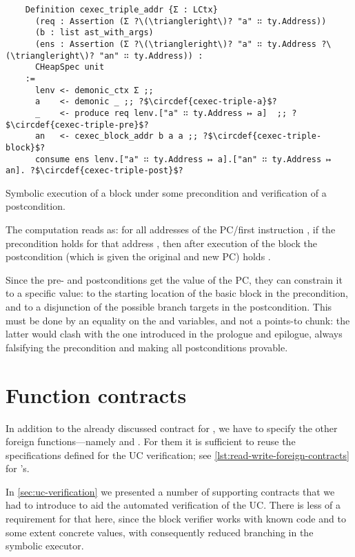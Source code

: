 \begin{listing}[htb]
  \startcstep
  \begin{verbatim}
    Definition cexec_triple_addr {Σ : LCtx}
      (req : Assertion (Σ ?\(\triangleright\)? "a" ∷ ty.Address))
      (b : list ast_with_args)
      (ens : Assertion (Σ ?\(\triangleright\)? "a" ∷ ty.Address ?\(\triangleright\)? "an" ∷ ty.Address)) :
      CHeapSpec unit
    :=
      lenv <- demonic_ctx Σ ;;
      a    <- demonic _ ;; ?$\circdef{cexec-triple-a}$?
      _    <- produce req lenv.["a" ∷ ty.Address ↦ a]  ;; ?$\circdef{cexec-triple-pre}$?
      an   <- cexec_block_addr b a a ;; ?$\circdef{cexec-triple-block}$?
      consume ens lenv.["a" ∷ ty.Address ↦ a].["an" ∷ ty.Address ↦ an]. ?$\circdef{cexec-triple-post}$?
  \end{verbatim}
  \caption{Symbolic execution of a block under some precondition and verification of a postcondition.}
  \label{lst:cexec-triple}
\end{listing}

The computation reads as: for all addresses of the PC/first instruction , if the precondition holds for that address , then after execution of the block  the postcondition (which is given the original and new PC) holds .

Since the pre- and postconditions get the value of the PC, they can constrain it to a specific value: to the starting location of the basic block in the precondition, and to a disjunction of the possible branch targets in the postcondition. This must be done by an equality on the  and  variables, and not a points-to chunk: the latter would clash with the one introduced in the prologue and epilogue, always falsifying the precondition and making all postconditions provable.

\section{Function contracts}

In addition to the already discussed contract for , we have to specify the other foreign functions---namely  and . For them it is sufficient to reuse the specifications defined for the UC verification; see \cref{lst:read-write-foreign-contracts} for 's.

In \cref{sec:uc-verification} we presented a number of supporting contracts that we had to introduce to aid the automated verification of the UC. There is less of a requirement for that here, since the block verifier works with known code and to some extent concrete values, with consequently reduced branching in the symbolic executor.

